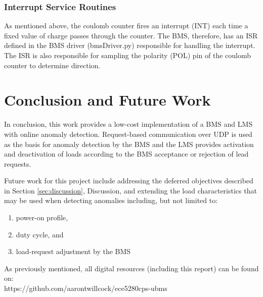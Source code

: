 \documentclass[11pt,conference,draftcls,onecolumn]{IEEEtran}
\begin{document}
\subsubsection{Interrupt Service Routines}
As mentioned above, the coulomb counter fires an interrupt (INT) each time a fixed value of charge passes through the counter.
The BMS, therefore, has an ISR defined in the BMS driver (bmsDriver.py) responsible for handling the interrupt.
The ISR is also responsible for sampling the polarity (POL) pin of the coulomb counter to determine direction.

\section{Conclusion and Future Work}\label{sec:conclusion}
In conclusion, this work provides a low-cost implementation of a BMS and LMS with online anomaly detection.
Request-based communication over UDP is used as the basis for anomaly detection by the BMS and the LMS provides activation and deactivation of loads according to the BMS acceptance or rejection of lead requests.

Future work for this project include addressing the deferred objectives described in Section \ref{sec:discussion}, Discussion, and extending the load characteristics that may be used when detecting anomalies including, but not limited to:
\begin{enumerate}
    \item power-on profile,
    \item duty cycle, and
    \item load-request adjustment by the BMS
\end{enumerate}

As previously mentioned, all digital resources (including this report) can be found on:\\
https://github.com/aarontwillcock/ece5280cps-ubms



\end{document}
